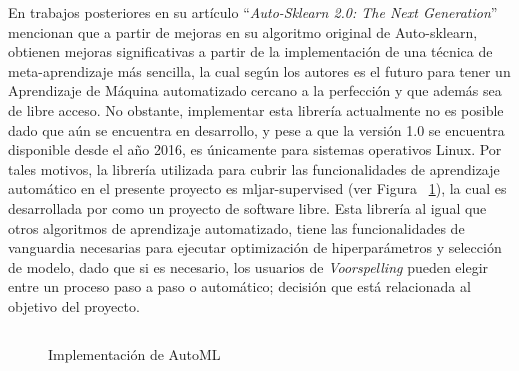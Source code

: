 En trabajos posteriores \textcite{Feurer2020} en su artículo ``\textit{Auto-Sklearn 2.0: The Next Generation}'' mencionan que a partir de mejoras en su algoritmo original de Auto-sklearn, obtienen mejoras significativas a partir de la implementación de una técnica de meta-aprendizaje más sencilla, la cual según los autores es el futuro para tener un Aprendizaje de Máquina automatizado cercano a la perfección y que además sea de libre acceso. No obstante, implementar esta librería actualmente no es posible dado que aún se encuentra en desarrollo, y pese a que la versión 1.0 se encuentra disponible desde el año 2016, es únicamente para sistemas operativos Linux. Por tales motivos, la librería utilizada para cubrir las funcionalidades de aprendizaje automático en el presente proyecto es mljar-supervised (ver Figura ~\ref{fig:impautoml}), la cual es desarrollada por \textcite{mljar2018} como un proyecto de software libre. Esta librería al igual que otros algoritmos de aprendizaje automatizado, tiene las funcionalidades de vanguardia necesarias para ejecutar optimización de hiperparámetros y selección de modelo, dado que si es necesario, los usuarios de \textit{Voorspelling} pueden elegir entre un proceso paso a paso o automático; decisión que está relacionada al objetivo del proyecto.

\begin{figure}[H]
    \centering
    \caption{Implementación de AutoML}
    \inputminted{Python}{pycode/automl.py}
    \label{fig:impautoml}
\end{figure}
